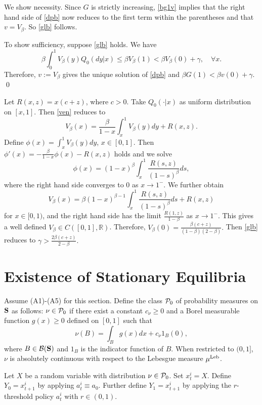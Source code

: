\documentclass[graybox]{svmult}
\def\bS{{\bf S}}
\begin{document}
We show necessity. Since $G$ is strictly increasing, \eqref{bg1v} implies that the right hand side of \eqref{dpb} now reduces to the first term within the parentheses and that $v=V_\beta$. So \eqref{glb} follows.



To show sufficiency, suppose \eqref{glb}  holds.  We have
$$
\beta\int_0^1 V_\beta(y) Q_0(dy|x)\le \beta V_\beta(1) <\beta V_\beta(0)+\gamma, \quad \forall x.
$$
Therefore, $v:= V_\beta$ gives the unique solution of  \eqref{dpb} and $\beta G(1)< \beta v(0)+\gamma$. \qed



\begin{example}
Let $R(x, z)= x(c+z)$, where $c>0$.  Take $Q_0(\cdot|x)$ as uniform distribution on $[x, 1]$.
Then \eqref{ven} reduces to
$$
V_\beta(x)= \frac{\beta}{1-x} \int_x^1V_\beta(y)dy +R(x, z).
$$
Define $\phi(x)= \int_x^1 V_\beta(y)dy$, $x\in [0, 1]$.
Then $\phi'(x)= -\frac{\beta}{1-x}\phi(x) -R(x, z)$ holds and we solve
$$
\phi(x)= (1-x)^\beta \int_x^1 \frac{R(s, z)}{(1-s)^\beta} ds,
$$
where the right hand side converges to 0 as $x\to 1^-$.
We further obtain
$$
V_\beta(x)= \beta (1-x)^{\beta-1}\int_x^1 \frac{R(s, z)}{(1-s)^\beta} ds +R(x, z)
$$
for $x\in [0, 1)$, and the right hand side has the limit $\frac{R(1,z)}{1-\beta}$
as $x\to 1^-$. This gives a well defined $V_\beta \in C([0, 1], \mathbb{R})$.
Therefore,
$
V_\beta(0)= \frac{\beta (c+z)}{(1-\beta)(2-\beta)}.
$
Then \eqref{glb} reduces to
$
\gamma > \frac{2\beta(c+z)}{ 2-\beta  }.
$
\end{example}






\section{Existence of  Stationary Equilibria}
\label{sec:se}


Assume (A1)-(A5) for this section.
Define the class ${\cal P}_0$ of probability measures  on $\bS$ as follows:
 $\nu\in {\cal P}_0$ if
there exist a constant $c_\nu\ge  0$ and a Borel measurable function $g(x)\ge 0$ defined on $[0,1]$ such that
$$
\nu(B) = \int_B g(x) dx +c_\nu 1_B(0),
$$
where $B\in {\cal B}(\bS)$ and $1_B$ is the indicator function of $B$.
When restricted to $(0, 1]$, $\nu$ is absolutely continuous with respect to the Lebesgue measure $\mu^{\rm Leb}$.

Let $X$ be a random variable with distribution $\nu\in {\cal P}_0$.
Set $x_t^i=X
$. Define $Y_0=x_{t+1}^i$ by applying $a_t^i\equiv a_0$.
Further define $Y_1=x_{t+1}^i$ by applying the $r$-threshold policy $a_t^i$ with  $r\in (0, 1)$.
\end{document}
